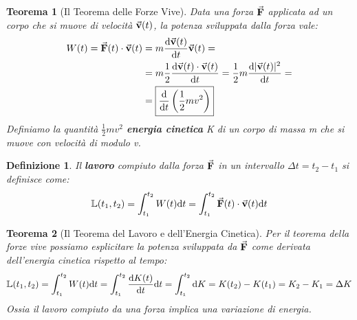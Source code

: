 \documentclass{article}
\newtheorem{thm}{Teorema}[section]
\newtheorem{defn}{Definizione}[section]
\renewcommand{\v}{\va{v}}
\newcommand{\F}{\va{F}}
\begin{document}
\begin{thm}[Il Teorema delle Forze Vive]
Data una forza $\F$ applicata ad un corpo che si muove di velocità $\v(t)$, la potenza sviluppata dalla forza vale:
\begin{equation}
\begin{split}
    W(t)=\F(t)\cdot\v(t)&=m\dv{\v(t)}{t}\v(t)=\\
    &=m\frac{1}{2}\dv{\v(t)\cdot\v(t)}{t}=\frac{1}{2}m\dv{|\v(t)|^2}{t}=\\
    &=\boxed{\dv{t}\left(\frac{1}{2}mv^2\right)}
\end{split}    
\end{equation}
Definiamo la quantità $\frac{1}{2}mv^2$ \textbf{energia cinetica} K di un corpo di massa m che si muove con velocità di modulo v.
\end{thm}
\begin{defn}
Il \textbf{lavoro} compiuto dalla forza $\F$ in un intervallo $\Delta t=t_2-t_1$ si definisce come:
\begin{equation}
    \mathbb{L}(t_1,t_2)=\int_{t_1}^{t_2}W(t)\dd t=\int_{t_1}^{t_2}\F(t)\cdot\v(t)\dd t
\end{equation}
\end{defn}
\begin{thm}[Il Teorema del Lavoro e dell'Energia Cinetica]
Per il teorema della forze vive possiamo esplicitare la potenza sviluppata da $\F$ come derivata dell'energia cinetica rispetto al tempo:
\begin{equation}
    \mathbb{L}(t_1,t_2)=\int_{t_1}^{t_2}W(t)\dd t=\int_{t_1}^{t_2}\dv{K(t)}{t}\dd t=\int_{t_1}^{t_2}\dd K=K(t_2)-K(t_1)=K_2-K_1=\Delta K
\end{equation}
Ossia il lavoro compiuto da una forza implica una variazione di energia.
\end{thm}
\end{document}

